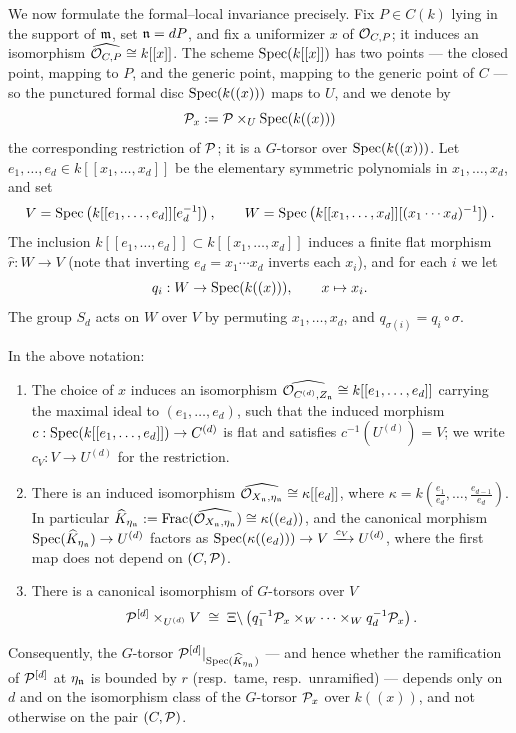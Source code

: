 We now formulate the formal--local invariance precisely. Fix $P \in C(k)$ lying in the support of $\mathfrak{m}$, set $\mathfrak{n} = dP$,
and fix a uniformizer $x$ of $\mathcal{O}_{C,P}$; it induces an isomorphism $\widehat{\mathcal{O}_{C,P}} \cong k[[x]]$.
The scheme $\operatorname{Spec}(k[[x]])$ has two points --- the closed point, mapping to $P$, and the generic point, mapping to the generic
point of $C$ --- so the punctured formal disc $\operatorname{Spec}(k((x)))$ maps to $U$, and we denote by
$$\mathcal{P}_x := \mathcal{P} \times_U \operatorname{Spec}(k((x)))$$
the corresponding restriction of $\mathcal{P}$; it is a $G$-torsor over $\operatorname{Spec}(k((x)))$.
Let $e_1, \dots, e_d \in k[[x_1, \dots, x_d]]$ be the elementary symmetric polynomials in $x_1, \dots, x_d$, and set
$$ V = \operatorname{Spec}\left(k[[e_1, \dots, e_d]][e_d^{-1}]\right), \qquad W = \operatorname{Spec}\left(k[[x_1, \dots, x_d]][(x_1 \cdots x_d)^{-1}]\right).$$
The inclusion $k[[e_1, \dots, e_d]] \subset k[[x_1, \dots, x_d]]$ induces a finite flat morphism $\hat{r}: W \to V$
(note that inverting $e_d = x_1 \cdots x_d$ inverts each $x_i$), and for each $i$ we let
$$ q_i : W \to \operatorname{Spec}(k((x))), \qquad x \mapsto x_i.$$
The group $S_d$ acts on $W$ over $V$ by permuting $x_1, \dots, x_d$, and $q_{\sigma(i)} = q_i \circ \sigma$.

\begin{lemma}\label{lemma:formal_local_invariance}
    In the above notation:
    \begin{enumerate}
        \item The choice of $x$ induces an isomorphism $\widehat{\mathcal{O}_{C^{(d)}, Z_{\mathfrak{n}}}} \cong k[[e_1, \dots, e_d]]$ carrying
        the maximal ideal to $(e_1, \dots, e_d)$, such that the induced morphism $c: \operatorname{Spec}(k[[e_1, \dots, e_d]]) \to C^{(d)}$
        is flat and satisfies $c^{-1}(U^{(d)}) = V$; we write $c_V : V \to U^{(d)}$ for the restriction.
        \item There is an induced isomorphism $\widehat{\mathcal{O}_{X_{\mathfrak{n}}, \eta_{\mathfrak{n}}}} \cong \kappa[[e_d]]$, where
        $\kappa = k(\frac{e_1}{e_d}, \dots, \frac{e_{d-1}}{e_d})$. In particular
        $\widehat{K}_{\eta_{\mathfrak{n}}} := \operatorname{Frac}(\widehat{\mathcal{O}_{X_{\mathfrak{n}}, \eta_{\mathfrak{n}}}}) \cong \kappa((e_d))$, and the canonical
        morphism $\operatorname{Spec}(\widehat{K}_{\eta_{\mathfrak{n}}}) \to U^{(d)}$ factors as
        $\operatorname{Spec}(\kappa((e_d))) \to V \xrightarrow{c_V} U^{(d)}$, where the first map does not depend on $(C, \mathcal{P})$.
        \item There is a canonical isomorphism of $G$-torsors over $V$
        $$ \mathcal{P}^{[d]} \times_{U^{(d)}} V \;\cong\; \Xi \backslash \left( q_1^{-1}\mathcal{P}_x \times_W \cdots \times_W q_d^{-1}\mathcal{P}_x \right).$$
    \end{enumerate}
    Consequently, the $G$-torsor $\mathcal{P}^{[d]}|_{\operatorname{Spec}(\widehat{K}_{\eta_{\mathfrak{n}}})}$ --- and hence whether the ramification of
    $\mathcal{P}^{[d]}$ at $\eta_{\mathfrak{n}}$ is bounded by $r$ (resp.\ tame, resp.\ unramified) --- depends only on $d$ and on the
    isomorphism class of the $G$-torsor $\mathcal{P}_x$ over $k((x))$, and not otherwise on the pair $(C, \mathcal{P})$.
\end{lemma}


